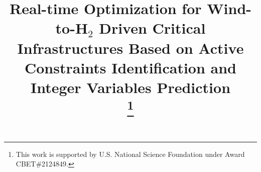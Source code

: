 \documentclass[conference]{IEEEtran}
\begin{document}
\title{\vspace{-.1cm} Real-time Optimization for Wind-to-H$_2$ Driven Critical Infrastructures Based on Active Constraints Identification and Integer Variables Prediction \\
\thanks{This work is supported by U.S. National Science Foundation under Award CBET\#2124849.}
}

\author{
\and
{}
}


\maketitle
\end{document}

